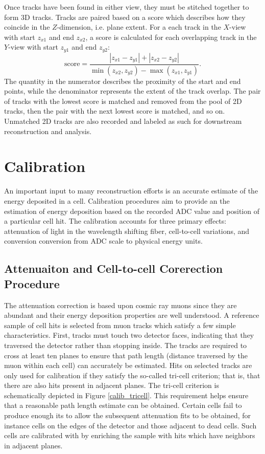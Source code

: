 Once tracks have been found in either view, they must be stitched together
to form 3D tracks.  Tracks are paired based on a score which describes how
they coincide in the $Z$-dimension, i.e. plane extent.
For a each track in the $X$-view with start $z_{x1}$ and end $z_{x2}$, a score
is calculated for each overlapping track in the $Y$-view with start
$z_{y1}$ and end $z_{y2}$:
\begin{equation}
\text{score} = \frac{|z_{x1}  - z_{y1} | + |z_{x2} - z_{y2}|}{\min(z_{x2}, z_{y2}) - \max(z_{x1},z_{y1} )}.
\end{equation}
The quantity in the numerator describes the proximity of the start and end
points, while the denominator represents the extent of the track overlap.
The pair of tracks with the lowest score is matched and removed from the pool
of 2D tracks, then the pair with the next lowest score is matched, and so on.
Unmatched 2D tracks are also recorded and labeled as such for downstream
reconstruction and analysis.

\section{Calibration}

An important input to many reconstruction efforts is an accurate estimate of
the energy deposited in a cell.  Calibration procedures aim to provide an the
estimation of energy deposition based on the recorded ADC value and position
of a particular cell hit.  The \nova calibration accounts for three primary
effects: attenuation
of light in the wavelength shifting fiber, cell-to-cell variations, and
conversion conversion from ADC scale to physical energy units.

\subsection{Attenuaiton and Cell-to-cell Corerection Procedure}

The attenuation correction is based upon cosmic ray muons since they are
abundant and their energy deposition properties are well understood.  A
reference sample of cell hits is selected from muon tracks which satisfy a few
simple characteristics.  First, tracks must touch two detector faces,
indicating that they traversed the detector rather than stopping inside.  The
tracks are required to cross at least ten planes to ensure that path length
(distance traversed by the muon within each cell) can accurately be estimated.
Hits on selected tracks are only used for calibration if they satisfy the
so-called tri-cell criterion; that is, that there are also hits present in
adjacent planes.
The tri-cell criterion is schematically depicted in Figure \ref{calib_tricell}.
This requirement helps ensure that a reasonable path
length estimate can be obtained.
Certain cells fail to produce enough its to allow
the subsequent attenuation fits to be obtained, for instance cells on the edges
of the detector and those adjacent to dead cells.  Such cells are calibrated
with by enriching the sample with hits which have neighbors in adjacent planes.


